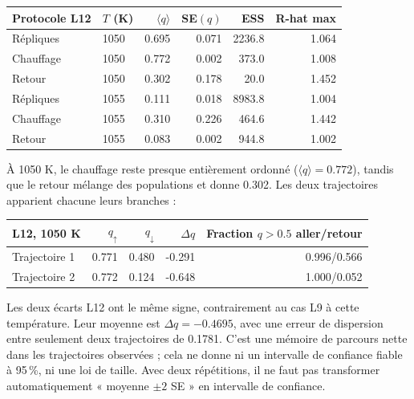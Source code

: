 \begin{center}\small\begin{tabular}{llrrrr}\toprule

Protocole L12 & $T$ (K) & $\langle q\rangle$ & SE$(q)$ & ESS & R-hat max\\\midrule

Répliques & 1050 & 0.695 & 0.071 & 2236.8 & 1.064\\

Chauffage & 1050 & 0.772 & 0.002 & 373.0 & 1.008\\

Retour & 1050 & 0.302 & 0.178 & 20.0 & 1.452\\

Répliques & 1055 & 0.111 & 0.018 & 8983.8 & 1.004\\

Chauffage & 1055 & 0.310 & 0.226 & 464.6 & 1.442\\

Retour & 1055 & 0.083 & 0.002 & 944.8 & 1.002\\

\bottomrule\end{tabular}\end{center}

À 1050 K, le chauffage reste presque entièrement ordonné ($\langle q\rangle=0.772$), tandis que le retour mélange des populations et donne 0.302. Les deux trajectoires apparient chacune leurs branches :

\begin{center}\small\begin{tabular}{lrrrr}\toprule

L12, 1050 K & $q_\uparrow$ & $q_\downarrow$ & $\Delta q$ & Fraction $q>0.5$ aller/retour\\\midrule

Trajectoire 1 & 0.771 & 0.480 & -0.291 & 0.996/0.566\\

Trajectoire 2 & 0.772 & 0.124 & -0.648 & 1.000/0.052\\

\bottomrule\end{tabular}\end{center}

Les deux écarts L12 ont le même signe, contrairement au cas L9 à cette température. Leur moyenne est $\Delta q=-0.4695$, avec une erreur de dispersion entre seulement deux trajectoires de 0.1781. C’est une mémoire de parcours nette dans les trajectoires observées ; cela ne donne ni un intervalle de confiance fiable à 95\,\%, ni une loi de taille. Avec deux répétitions, il ne faut pas transformer automatiquement « moyenne $\pm2$ SE » en intervalle de confiance.

